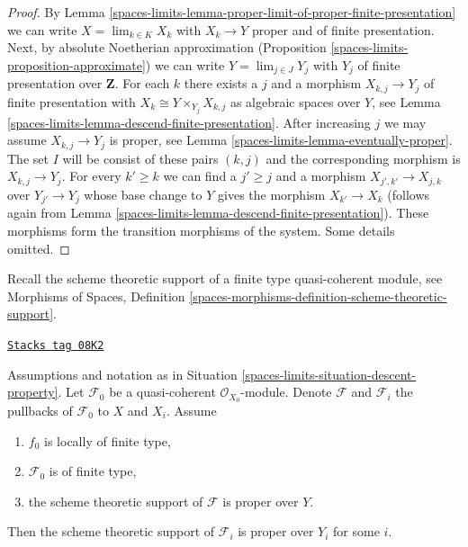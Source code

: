 \begin{proof}
By Lemma \ref{spaces-limits-lemma-proper-limit-of-proper-finite-presentation}
we can write $X = \lim_{k \in K} X_k$ with $X_k \to Y$ proper and
of finite presentation. Next, by absolute Noetherian approximation
(Proposition \ref{spaces-limits-proposition-approximate}) we can
write $Y = \lim_{j \in J} Y_j$ with $Y_j$ of finite presentation
over $\mathbf{Z}$.
For each $k$ there exists a $j$ and a morphism $X_{k, j} \to Y_j$
of finite presentation with $X_k \cong Y \times_{Y_j} X_{k, j}$
as algebraic spaces over $Y$, see
Lemma \ref{spaces-limits-lemma-descend-finite-presentation}.
After increasing $j$ we may assume $X_{k, j} \to Y_j$ is proper, see
Lemma \ref{spaces-limits-lemma-eventually-proper}. The set $I$ will be consist
of these pairs $(k, j)$ and the corresponding morphism is $X_{k, j} \to Y_j$.
For every $k' \geq k$ we can find a $j' \geq j$ and a morphism
$X_{j', k'} \to X_{j, k}$ over $Y_{j'} \to Y_j$ whose base change to $Y$
gives the morphism $X_{k'} \to X_k$ (follows again from
Lemma \ref{spaces-limits-lemma-descend-finite-presentation}).
These morphisms form the transition morphisms of the system. Some details
omitted.
\end{proof}

Recall the scheme theoretic support of
a finite type quasi-coherent module, see
Morphisms of Spaces, Definition
\ref{spaces-morphisms-definition-scheme-theoretic-support}.

\begin{lemma}
\label{spaces-limits-lemma-eventually-proper-support}
\href{https://stacks.math.columbia.edu/tag/08K2}{\texttt{Stacks tag 08K2}}

Assumptions and notation as in Situation \ref{spaces-limits-situation-descent-property}.
Let $\mathcal{F}_0$ be a quasi-coherent $\mathcal{O}_{X_0}$-module.
Denote $\mathcal{F}$ and $\mathcal{F}_i$ the pullbacks of
$\mathcal{F}_0$ to $X$ and $X_i$. Assume
\begin{enumerate}
\item $f_0$ is locally of finite type,
\item $\mathcal{F}_0$ is of finite type,
\item the scheme theoretic support of $\mathcal{F}$ is proper over $Y$.
\end{enumerate}
Then the scheme theoretic support of $\mathcal{F}_i$ is proper over $Y_i$
for some $i$.
\end{lemma}

